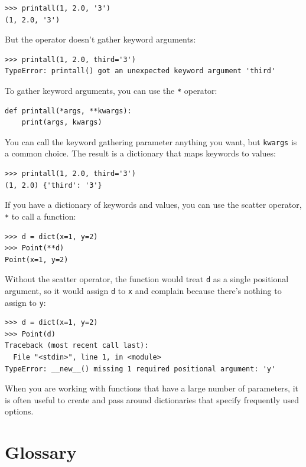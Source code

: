 \documentclass[10pt]{book}
\begin{document}
\begin{verbatim}
>>> printall(1, 2.0, '3')
(1, 2.0, '3')
\end{verbatim}
%
But the {\tt *} operator doesn't gather keyword arguments:

\begin{verbatim}
>>> printall(1, 2.0, third='3')
TypeError: printall() got an unexpected keyword argument 'third'
\end{verbatim}
%
To gather keyword arguments, you can use the {\tt **} operator:

\begin{verbatim}
def printall(*args, **kwargs):
    print(args, kwargs)
\end{verbatim}
%
You can call the keyword gathering parameter anything you want, but
{\tt kwargs} is a common choice.  The result is a dictionary that maps
keywords to values:

\begin{verbatim}
>>> printall(1, 2.0, third='3')
(1, 2.0) {'third': '3'}
\end{verbatim}
%
If you have a dictionary of keywords and values, you can use the
scatter operator, {\tt **} to call a function:

\begin{verbatim}
>>> d = dict(x=1, y=2)
>>> Point(**d)
Point(x=1, y=2)
\end{verbatim}
%
Without the scatter operator, the function would treat {\tt d} as
a single positional argument, so it would assign {\tt d} to
{\tt x} and complain because there's nothing to assign to {\tt y}:

\begin{verbatim}
>>> d = dict(x=1, y=2)
>>> Point(d)
Traceback (most recent call last):
  File "<stdin>", line 1, in <module>
TypeError: __new__() missing 1 required positional argument: 'y'
\end{verbatim}
%
When you are working with functions that have a large number of
parameters, it is often useful to create and pass around dictionaries
that specify frequently used options.


\section{Glossary}
\end{document}
